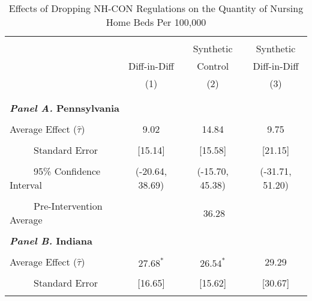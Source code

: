 \documentclass[../Main.tex]{subfiles}
\begin{document}
\newpage
\null
\vfill
\begin{table}[htbp]\centering \footnotesize
\def\sym#1{\ifmmode^{#1}\else\(^{#1}\)\fi}
\captionsetup{width=.75\textwidth}
\caption{\centering Effects of Dropping NH-CON Regulations on the Quantity of Nursing Home Beds Per 100,000}
\label{tab:ave_results_q_nhb}
\setlength{\tabcolsep}{10pt}
\begin{tabular}{l*{3}{c}}
\hline\hline
\\[-2ex]
&\multicolumn{1}{c}{}&\multicolumn{1}{c}{Synthetic}&\multicolumn{1}{c}{Synthetic}\\
&\multicolumn{1}{c}{Diff-in-Diff}&\multicolumn{1}{c}{Control}&\multicolumn{1}{c}{Diff-in-Diff}\\
&\multicolumn{1}{c}{(1)}&\multicolumn{1}{c}{(2)}&\multicolumn{1}{c}{(3)}\\
\\[-2ex]
\hline
\\[-.1ex]
\multicolumn{4}{l}{\textbf{\textit{Panel A.} Pennsylvania}}\\
\\[-1.5ex]
\multicolumn{1}{l}{Average Effect ($\hat{\tau}$)}&   \multicolumn{1}{c}{9.02}&   \multicolumn{1}{c}{14.84}&  \multicolumn{1}{c}{9.75}\\
\\[-2ex]
\multicolumn{1}{l}{\ \ \ \ \ Standard Error}  &\multicolumn{1}{c}{[15.14]}&\multicolumn{1}{c}{[15.58]}&\multicolumn{1}{c}{[21.15]}\\
\\[-2ex]
\multicolumn{1}{l}{\ \ \ \ \ 95\% Confidence Interval}&   \multicolumn{1}{c}{(-20.64, 38.69)}&   \multicolumn{1}{c}{(-15.70, 45.38)}&   \multicolumn{1}{c}{(-31.71, 51.20)}\\
\\[-2ex]
\multicolumn{1}{l}{\ \ \ \ \ Pre-Intervention Average}&   \multicolumn{3}{c}{36.28}\\
\\[-.1ex]
\multicolumn{4}{l}{\textbf{\textit{Panel B.} Indiana}}\\
\\[-1.5ex]
\multicolumn{1}{l}{Average Effect ($\hat{\tau}$)}&   \multicolumn{1}{c}{$27.68^{*}$}&   \multicolumn{1}{c}{$26.54^{*}$}&  \multicolumn{1}{c}{29.29}\\
\\[-2ex]
\multicolumn{1}{l}{\ \ \ \ \ Standard Error}  &\multicolumn{1}{c}{[16.65]}&\multicolumn{1}{c}{[15.62]}&\multicolumn{1}{c}{[30.67]}\\
\\[-2ex]

\end{tabular}
\end{table}
\end{document}
